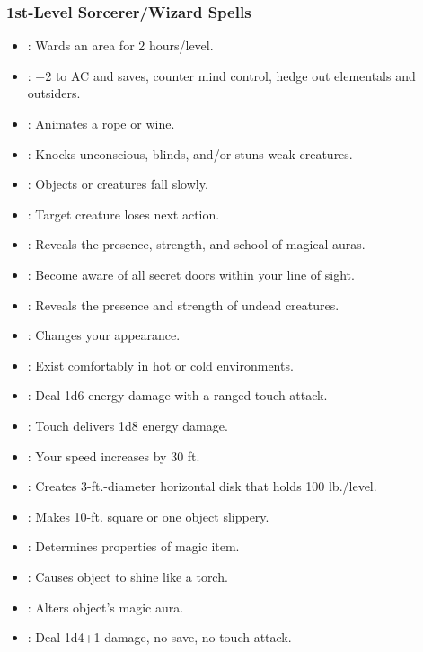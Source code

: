 \subsubsection{1st-Level Sorcerer/Wizard Spells}
\begin{itemize}
\item {}: Wards an area for 2 hours/level.
\item {}: +2 to AC and saves, counter mind control, hedge out elementals and outsiders.
\item {}: Animates a rope or wine.
\item {}: Knocks unconscious, blinds, and/or stuns weak creatures.
\item {}: Objects or creatures fall slowly.
\item {}: Target creature loses next action.
\item {}: Reveals the presence, strength, and school of magical auras.
\item {}: Become aware of all secret doors within your line of sight.
\item {}: Reveals the presence and strength of undead creatures.
\item {}: Changes your appearance.
\item {}: Exist comfortably in hot or cold environments.
\item {}: Deal 1d6 energy damage with a ranged touch attack.
\item {}: Touch delivers 1d8 energy damage.
\item {}: Your speed increases by 30 ft.
\item {}: Creates 3-ft.-diameter horizontal disk that holds 100 lb./level.
\item {}: Makes 10-ft. square or one object slippery.
\item {}: Determines properties of magic item.
\item {}: Causes object to shine like a torch.
\item {}: Alters object's magic aura.
\item {}: Deal 1d4+1 damage, no save, no touch attack.

\end{itemize}
